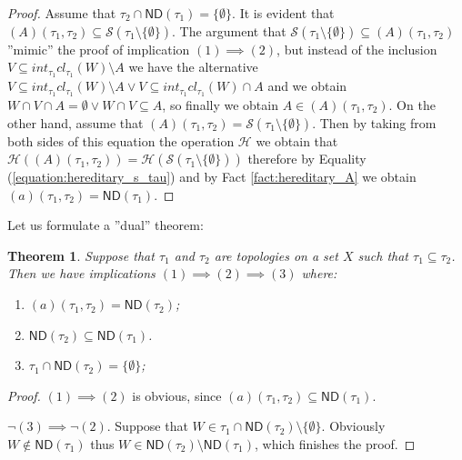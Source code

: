 \documentclass[12pt]{amsart}
\theoremstyle{plain}
\newtheorem{theorem}{Theorem}[section]
\theoremstyle{definition}
\theoremstyle{remark}
\newcommand{\cl}{\mathit{cl}}
\newcommand{\cS}{{\mathcal S}}
\newcommand{\mathint}{\mathit{int}}
\newcommand{\aideal}{\mathit{(a)}}
\newcommand{\Afield}{\mathit{(A)}}
\newcommand{\Hereditary}{\mathcal{H}}
\begin{document}
\begin{proof}
Assume that $\tau_2 \cap \mathsf{ND}(\tau_1) = \lbrace \emptyset \rbrace$.
It is evident that $\Afield(\tau_1, \tau_2) \subseteq \cS(\tau_1 \setminus \lbrace \emptyset \rbrace)$.
The argument that $\cS(\tau_1 \setminus \lbrace \emptyset \rbrace)\subseteq \Afield(\tau_1, \tau_2)$
''mimic'' the proof of implication $(1) \implies (2)$, but instead of the inclusion
$V \subseteq \mathint_{\tau_1} \cl_{\tau_1} (W) \setminus A$ we have the alternative
$V \subseteq \mathint_{\tau_1} \cl_{\tau_1} (W) \setminus A \vee V \subseteq \mathint_{\tau_1} \cl_{\tau_1} (W) \cap A$ 
and  we obtain $W \cap V \cap A = \emptyset \vee W \cap V \subseteq A$, so finally we
obtain $A \in \Afield(\tau_1, \tau_2)$.
On the other hand, assume that 
$\Afield(\tau_1, \tau_2) = \cS(\tau_1 \setminus \lbrace \emptyset \rbrace)$. 
Then by taking from both sides of this equation the operation $\Hereditary$
we obtain that 
$\Hereditary(\Afield(\tau_1, \tau_2)) = \Hereditary(\cS(\tau_1 \setminus \lbrace \emptyset \rbrace))$
therefore by Equality (\ref{equation:hereditary_s_tau}) 
and by Fact \ref{fact:hereditary_A} we obtain
$\aideal(\tau_1, \tau_2) = \mathsf{ND}(\tau_1)$.
\end{proof}

Let us formulate a ''dual'' theorem:

\begin{theorem}
Suppose that $\tau_1$ and $\tau_2$ are topologies on a set $X$ such
that $\tau_1 \subseteq \tau_2$.
Then we have implications $(1) \implies (2) \implies (3)$
where:
\begin{enumerate}
\item $\aideal(\tau_1, \tau_2) = \mathsf{ND}(\tau_2)$;
\item $\mathsf{ND}(\tau_2) \subseteq \mathsf{ND}(\tau_1)$.
\item $\tau_1 \cap \mathsf{ND}(\tau_2) = \lbrace \emptyset \rbrace$;
\end{enumerate}
\end{theorem}

\begin{proof}
$(1)\implies (2)$ is obvious, since
$\aideal(\tau_1, \tau_2) \subseteq \mathsf{ND}(\tau_1)$.

$\neg(3)\implies \neg(2)$.
Suppose that $W\in\tau_1\cap\mathsf{ND}(\tau_2) \setminus \lbrace\emptyset\rbrace$.
Obviously $W\not\in\mathsf{ND}(\tau_1)$ thus
$W \in \mathsf{ND}(\tau_2) \setminus \mathsf{ND}(\tau_1)$,
which finishes the proof.
\end{proof}
\end{document}
